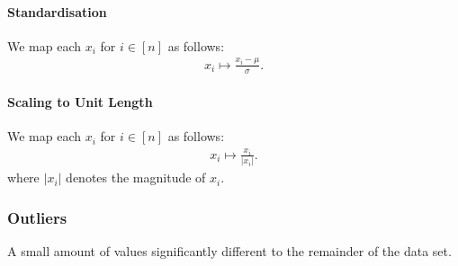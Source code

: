 \paragraph{Standardisation} We map each $x_i$ for $i \in [n]$ as follows:
\begin{gather*}
    x_i \mapsto \frac{x_i - \mu}{\sigma}.
\end{gather*}

\paragraph{Scaling to Unit Length} We map each $x_i$ for $i \in [n]$ as follows:
\begin{gather*}
    x_i \mapsto \frac{x_i}{|x_i|}.
\end{gather*} where $|x_i|$ denotes the magnitude of $x_i$.

\subsubsection{Outliers}

A small amount of values significantly different to the remainder
of the data set.